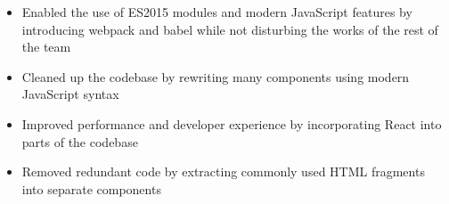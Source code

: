 
\begin{itemize}
  \item Enabled the use of ES2015 modules and modern JavaScript features by
  introducing webpack and babel while not disturbing the works of the rest of
  the team
  \item Cleaned up the codebase by rewriting many components using modern
  JavaScript syntax
  \item Improved performance and developer experience by incorporating React into
  parts of the codebase
  \item Removed redundant code by extracting commonly used HTML fragments into
  separate components
\end{itemize}
